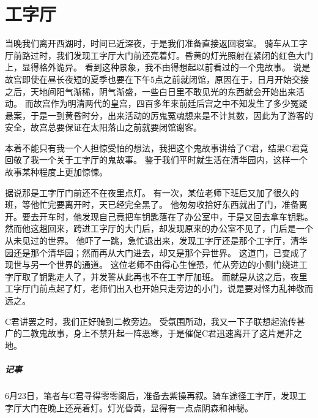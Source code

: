 \chapter{工字厅}

当晚我们离开西湖时，时间已近深夜，于是我们准备直接返回寝室。
骑车从工字厅前路过时，我们发现工字厅大门前还亮着灯。昏黄的灯光照射在紧闭的红色大门上，显得格外诡异。
看到这种景象，我不由得想起以前看过的一个鬼故事。
说是故宫即使在昼长夜短的夏季也要在下午5点之前就闭馆，原因在于，日月开始交接之后，天地间阳气渐稀，阴气渐盛，一些白日里不敢见光的东西就会开始出来活动。
而故宫作为明清两代的皇宫，四百多年来前廷后宫之中不知发生了多少冤疑悬案，于是一到黄昏时分，出来活动的厉鬼冤魂想来是不计其数，因此为了游客的安全，故宫总要保证在太阳落山之前就要闭馆谢客。

本着不能只有我一个人担惊受怕的想法，我把这个鬼故事讲给了C君，结果C君竟回敬了我一个关于工字厅的鬼故事。
鉴于我们平时就生活在清华园内，这样一个故事某种程度上更加惊悚。

据说那是工字厅门前还不在夜里点灯。
有一次，某位老师下班后又加了很久的班，等他忙完要离开时，天已经完全黑了。
他匆匆收拾好东西就出了门，准备离开。要去开车时，他发现自己竟把车钥匙落在了办公室中，于是又回去拿车钥匙。
然而他这趟回来，跨进工字厅的大门后，却发现原来的办公室不见了，门后是一个从未见过的世界。
他吓了一跳，急忙退出来，发现工字厅还是那个工字厅，清华园还是那个清华园；然而再从大门进去，却又是那个异世界。
这道门，已变成了现世与另一个世界的通道。
这位老师不由得心生惶恐，忙从旁边的小侧门绕进工字厅取了钥匙走人了，并发誓从此再也不在工字厅加班。
而就是从这之后，夜里工字厅门前点起了灯，老师们出入也开始只走旁边的小门，说是要对怪力乱神敬而远之。

C君讲罢之时，我们正好骑到二教旁边。
受氛围所动，我又一下子联想起流传甚广的二教鬼故事，身上不禁升起一阵恶寒，于是催促C君迅速离开了这片是非之地。

\paragraph{记事}
6月23日，笔者与C君寻得零零阁后，准备去紫操再叙。骑车途径工字厅，发现工字厅大门在晚上还亮着灯。灯光昏黄，显得有一点点阴森和神秘。

